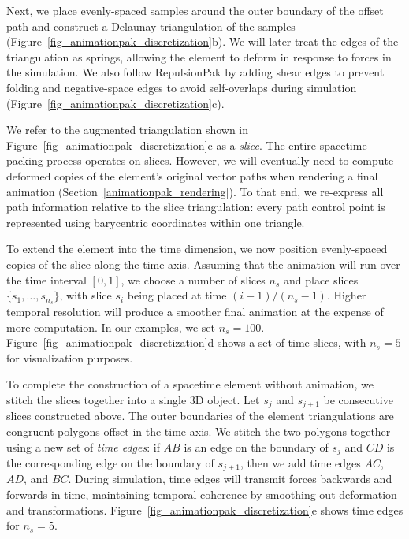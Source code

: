 \newtext
{
Next, we place evenly-spaced samples around the outer boundary of 
the offset path and construct a Delaunay triangulation of the samples
(Figure~\ref{fig_animationpak_discretization}b). We will
later treat the edges of the triangulation as springs, allowing the
element to deform in response to forces in the simulation.  
We also follow RepulsionPak by adding shear edges to prevent
folding and negative-space edges to avoid self-overlaps during simulation
(Figure~\ref{fig_animationpak_discretization}c).
}

We refer to the augmented triangulation shown in 
Figure~\ref{fig_animationpak_discretization}c as a \textit{slice}.  
The entire spacetime packing process operates on slices.  
However, we will eventually
need to compute deformed copies of the element's original vector paths 
when rendering a final animation (Section~\ref{animationpak_rendering}).
To that end, we re-express all path information relative to the
slice triangulation: every path control point is represented using
barycentric coordinates within one triangle.

To extend the element into the time dimension, 
we now position evenly-spaced copies of the slice along the time axis.
Assuming that the animation will run over the time interval $[0,1]$, 
we choose a number of slices $n_s$ and place slices $\{s_1,\ldots,s_{n_s}\}$,
with slice $s_i$ being placed at time $(i-1)/(n_s-1)$.
Higher temporal resolution will
produce a smoother final animation at the expense of more computation.
In our examples, we set $n_s=100$. 
Figure~\ref{fig_animationpak_discretization}d shows a set of time slices, with
$n_s=5$ for visualization purposes.

To complete the construction of a spacetime element without animation,
we stitch the slices together into a single 3D object.  Let $s_j$ and
$s_{j+1}$ be consecutive slices constructed above.  The outer boundaries
of the element triangulations are congruent polygons offset in the time 
axis.  We stitch the two polygons together using a new set of 
\textit{time edges}: if $AB$ is an edge on the boundary of $s_j$ and
$CD$ is the corresponding edge on the boundary of $s_{j+1}$, then
we add time edges $AC$, $AD$, and $BC$.
During simulation, time edges will transmit forces backwards and forwards in
time, maintaining temporal coherence by smoothing out deformation and 
transformations.
Figure~\ref{fig_animationpak_discretization}e shows time edges for $n_s=5$.

